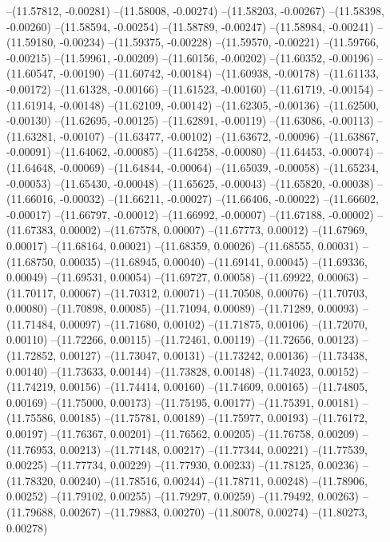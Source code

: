 --(11.57812, -0.00281)
--(11.58008, -0.00274)
--(11.58203, -0.00267)
--(11.58398, -0.00260)
--(11.58594, -0.00254)
--(11.58789, -0.00247)
--(11.58984, -0.00241)
--(11.59180, -0.00234)
--(11.59375, -0.00228)
--(11.59570, -0.00221)
--(11.59766, -0.00215)
--(11.59961, -0.00209)
--(11.60156, -0.00202)
--(11.60352, -0.00196)
--(11.60547, -0.00190)
--(11.60742, -0.00184)
--(11.60938, -0.00178)
--(11.61133, -0.00172)
--(11.61328, -0.00166)
--(11.61523, -0.00160)
--(11.61719, -0.00154)
--(11.61914, -0.00148)
--(11.62109, -0.00142)
--(11.62305, -0.00136)
--(11.62500, -0.00130)
--(11.62695, -0.00125)
--(11.62891, -0.00119)
--(11.63086, -0.00113)
--(11.63281, -0.00107)
--(11.63477, -0.00102)
--(11.63672, -0.00096)
--(11.63867, -0.00091)
--(11.64062, -0.00085)
--(11.64258, -0.00080)
--(11.64453, -0.00074)
--(11.64648, -0.00069)
--(11.64844, -0.00064)
--(11.65039, -0.00058)
--(11.65234, -0.00053)
--(11.65430, -0.00048)
--(11.65625, -0.00043)
--(11.65820, -0.00038)
--(11.66016, -0.00032)
--(11.66211, -0.00027)
--(11.66406, -0.00022)
--(11.66602, -0.00017)
--(11.66797, -0.00012)
--(11.66992, -0.00007)
--(11.67188, -0.00002)
--(11.67383, 0.00002)
--(11.67578, 0.00007)
--(11.67773, 0.00012)
--(11.67969, 0.00017)
--(11.68164, 0.00021)
--(11.68359, 0.00026)
--(11.68555, 0.00031)
--(11.68750, 0.00035)
--(11.68945, 0.00040)
--(11.69141, 0.00045)
--(11.69336, 0.00049)
--(11.69531, 0.00054)
--(11.69727, 0.00058)
--(11.69922, 0.00063)
--(11.70117, 0.00067)
--(11.70312, 0.00071)
--(11.70508, 0.00076)
--(11.70703, 0.00080)
--(11.70898, 0.00085)
--(11.71094, 0.00089)
--(11.71289, 0.00093)
--(11.71484, 0.00097)
--(11.71680, 0.00102)
--(11.71875, 0.00106)
--(11.72070, 0.00110)
--(11.72266, 0.00115)
--(11.72461, 0.00119)
--(11.72656, 0.00123)
--(11.72852, 0.00127)
--(11.73047, 0.00131)
--(11.73242, 0.00136)
--(11.73438, 0.00140)
--(11.73633, 0.00144)
--(11.73828, 0.00148)
--(11.74023, 0.00152)
--(11.74219, 0.00156)
--(11.74414, 0.00160)
--(11.74609, 0.00165)
--(11.74805, 0.00169)
--(11.75000, 0.00173)
--(11.75195, 0.00177)
--(11.75391, 0.00181)
--(11.75586, 0.00185)
--(11.75781, 0.00189)
--(11.75977, 0.00193)
--(11.76172, 0.00197)
--(11.76367, 0.00201)
--(11.76562, 0.00205)
--(11.76758, 0.00209)
--(11.76953, 0.00213)
--(11.77148, 0.00217)
--(11.77344, 0.00221)
--(11.77539, 0.00225)
--(11.77734, 0.00229)
--(11.77930, 0.00233)
--(11.78125, 0.00236)
--(11.78320, 0.00240)
--(11.78516, 0.00244)
--(11.78711, 0.00248)
--(11.78906, 0.00252)
--(11.79102, 0.00255)
--(11.79297, 0.00259)
--(11.79492, 0.00263)
--(11.79688, 0.00267)
--(11.79883, 0.00270)
--(11.80078, 0.00274)
--(11.80273, 0.00278)
